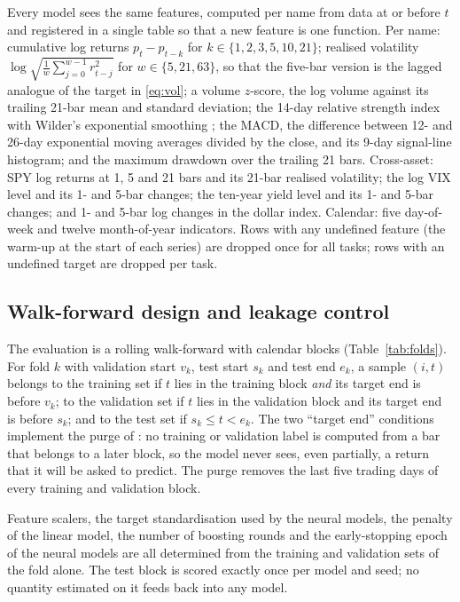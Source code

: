 \documentclass[10pt,a4paper,twoside,twocolumn]{article}
\begin{document}
Every model sees the same \metanfeatures{} features, computed per name from data at or before $t$ and registered in a single table so that a new feature is one function. Per name: cumulative log returns $p_{t}-p_{t-k}$ for $k\in\{1,2,3,5,10,21\}$; realised volatility $\log\sqrt{\tfrac{1}{w}\sum_{j=0}^{w-1}r_{t-j}^2}$ for $w\in\{5,21,63\}$, so that the five-bar version is the lagged analogue of the target in \eqref{eq:vol}; a volume $z$-score, the log volume against its trailing 21-bar mean and standard deviation; the 14-day relative strength index with Wilder's exponential smoothing \citep{wilder1978new}; the MACD, the difference between 12- and 26-day exponential moving averages divided by the close, and its 9-day signal-line histogram; and the maximum drawdown over the trailing 21 bars. Cross-asset: SPY log returns at 1, 5 and 21 bars and its 21-bar realised volatility; the log VIX level and its 1- and 5-bar changes; the ten-year yield level and its 1- and 5-bar changes; and 1- and 5-bar log changes in the dollar index. Calendar: five day-of-week and twelve month-of-year indicators. Rows with any undefined feature (the warm-up at the start of each series) are dropped once for all tasks; rows with an undefined target are dropped per task.

\subsection{Walk-forward design and leakage control}\label{sec:walkforward}

The evaluation is a rolling walk-forward with calendar blocks (Table~\ref{tab:folds}). For fold $k$ with validation start $v_k$, test start $s_k$ and test end $e_k$, a sample $(i,t)$ belongs to the training set if $t$ lies in the training block \emph{and} its target end is before $v_k$; to the validation set if $t$ lies in the validation block and its target end is before $s_k$; and to the test set if $s_k\le t<e_k$. The two ``target end'' conditions implement the purge of \citet{lopezdeprado2018advances}: no training or validation label is computed from a bar that belongs to a later block, so the model never sees, even partially, a return that it will be asked to predict. The purge removes the last five trading days of every training and validation block.

Feature scalers, the target standardisation used by the neural models, the penalty of the linear model, the number of boosting rounds and the early-stopping epoch of the neural models are all determined from the training and validation sets of the fold alone. The test block is scored exactly once per model and seed; no quantity estimated on it feeds back into any model.
\end{document}
